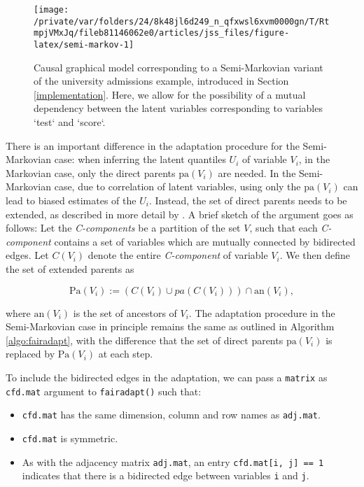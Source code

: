 \documentclass[
  nojss]{jss}
\providecommand{\tightlist}{%
  \setlength{\itemsep}{0pt}\setlength{\parskip}{0pt}}
\begin{document}
\begin{CodeChunk}
\begin{figure}

{\centering \texttt{[image: /private/var/folders/24/8k48jl6d249\_n\_qfxwsl6xvm0000gn/T/RtmpjVMxJq/fileb81146062e0/articles/jss\_files/figure-latex/semi-markov-1]} 

}

\caption[Causal graphical model corresponding to a Semi-Markovian variant of the university admissions example, introduced in Section \ref{implementation}]{Causal graphical model corresponding to a Semi-Markovian variant of the university admissions example, introduced in Section \ref{implementation}. Here, we allow for the possibility of a mutual dependency between the latent variables corresponding to variables `test` and `score`.}\label{fig:semi-markov}
\end{figure}
\end{CodeChunk}

There is an important difference in the adaptation procedure for the
Semi-Markovian case: when inferring the latent quantiles \(U_i\) of
variable \(V_i\), in the Markovian case, only the direct parents
\(\mathrm{pa}(V_i)\) are needed. In the Semi-Markovian case, due to
correlation of latent variables, using only the \(\mathrm{pa}(V_i)\) can
lead to biased estimates of the \(U_i\). Instead, the set of direct
parents needs to be extended, as described in more detail by
\citet{tian2002general}. A brief sketch of the argument goes as follows:
Let the \emph{C-components} be a partition of the set \(V\), such that
each \emph{C-component} contains a set of variables which are mutually
connected by bidirected edges. Let \(C(V_i)\) denote the entire
\emph{C-component} of variable \(V_i\). We then define the set of
extended parents as

\[\mathrm{Pa}(V_i) := (C(V_i) \cup pa(C(V_i))) \cap \mathrm{an}(V_i),\]

where \(\mathrm{an}(V_i)\) is the set of ancestors of \(V_i\). The
adaptation procedure in the Semi-Markovian case in principle remains the
same as outlined in Algorithm \ref{algo:fairadapt}, with the difference
that the set of direct parents \(\mathrm{pa}(V_i)\) is replaced by
\(\mathrm{Pa}(V_i)\) at each step.

To include the bidirected edges in the adaptation, we can pass a
\texttt{matrix} as \texttt{cfd.mat} argument to \texttt{fairadapt()}
such that:

\begin{itemize}
\tightlist
\item
  \texttt{cfd.mat} has the same dimension, column and row names as
  \texttt{adj.mat}.
\item
  \texttt{cfd.mat} is symmetric.
\item
  As with the adjacency matrix \texttt{adj.mat}, an entry
  \texttt{cfd.mat{[}i,\ j{]}\ ==\ 1} indicates that there is a
  bidirected edge between variables \texttt{i} and \texttt{j}.
\end{itemize}
\end{document}
